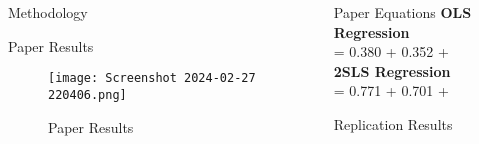 \documentclass[final]{beamer}
\begin{document}
\begin{frame}[t]
\begin{columns}[T]
\begin{column}{.32\textwidth}
\begin{block}{\Huge Methodology}
    \normalsize 
    \end{block}

    \vspace{1cm} %
\begin{block}{\Huge Paper Results} %
    \Large %
    \end{block}
\begin{figure}
    \centering
    \texttt{[image: Screenshot 2024-02-27 220406.png]}
    \caption{Paper Results}
    \label{fig:enter-label}
\end{figure}
    \vspace{1cm} %

    \vspace{1cm} %
   
\end{column}

\begin{column}{.32\textwidth}

        \begin{block}{\Huge Paper Equations} %
            \Large %
\centering
\textbf{OLS  Regression }\\
\normalsize
{} = 0.380 + 0.352 + \epsilon \\
\large
\textbf{2SLS  Regression} \\
\normalsize
{} = 0.771 + 0.701 + \epsilon

    
    \end{block}
 \begin{block}{\Huge Replication Results} %
    \Large %



\end{block}
\end{column}
\end{columns}
\end{frame}
\end{document}
